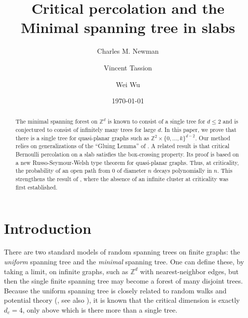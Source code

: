 \documentclass[12pt, twoside,a4paper,reqno]{amsart}
\theoremstyle{plain}
\theoremstyle{remark}
\theoremstyle{definition}
\newcommand{\Z}{\mathbb{Z}}
\begin{document}
\title{Critical percolation and the Minimal spanning tree in slabs}
\author{Charles M. Newman}
\author{Vincent Tassion}
\author{Wei Wu}
\address[Charles Newman]{Courant Institute of Mathematical Sciences, New York University,
251 Mercer st, New York, NY 10012, USA \newline
\& NYU-ECNU Institute of Mathematical Sciences at NYU Shanghai, 3663 Zhongshan Road North, Shanghai 200062,
China.}
\address[Vincent Tassion]{D\'epartement de Math\'ematiques Universit\'e de Geneve, Geneve, Switzerland
}
\address[Wei Wu]{Courant Institute of Mathematical Sciences, New York University,
251 Mercer st, New York, NY 10012, USA \newline
\& NYU-ECNU Institute of Mathematical Sciences at NYU Shanghai, 3663 Zhongshan Road North, Shanghai 200062,
China.}
\date{\today }
\maketitle

\begin{abstract}
  The minimal spanning forest on $\Z^d$ is known to consist of a single tree for
  $d \leq 2$ and is conjectured to consist of infinitely many trees for large $d$. In this
  paper, we prove that there is a single tree for quasi-planar graphs such as
  $\Z^2\times {\{0,\ldots,k\}}^{d-2}$.
  Our method relies on generalizations of the ``Gluing Lemma'' of \cite{DST}. A
  related result is that critical Bernoulli percolation on a slab satisfies the
  box-crossing property. Its proof is based on a new Russo-Seymour-Welsh type theorem for
  quasi-planar graphs. Thus, at criticality, the probability of an open path
  from $0$ of diameter $n$ decays polynomially in $n$. This strengthens the
  result of \cite{DST}, where the absence of an infinite cluster at criticality
  was first established.
\end{abstract}

\section{Introduction}

 There are two standard models of
random spanning trees on finite graphs: the {\it uniform\/} spanning tree and
the {\it minimal\/} spanning tree. One can define these, by taking a limit, on
infinite graphs, such as $\Z^d$ with nearest-neighbor edges, but then the single
finite spanning tree may become a forest of many disjoint trees. Because the
uniform spanning tree is closely related to random walks and potential theory
(\cite{Wil}, see also \cite{BLPS}), it is known \cite{Pem} that the critical
dimension is exactly $d_{c}=4$, only above which is there more than a single
tree.
\end{document}

